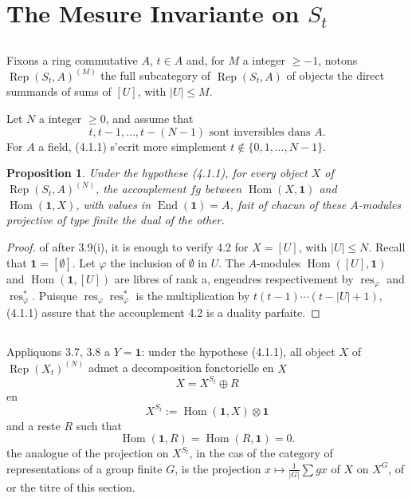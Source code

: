 \documentclass[11pt,a4paper]{article}
\theoremstyle{plain}
\newtheorem{proposition}[theorem]{Proposition}
\theoremstyle{definition}
\DeclareMathOperator{\Hom}{Hom}
\DeclareMathOperator{\End}{End}
\DeclareMathOperator{\Rep}{Rep}
\DeclareMathOperator{\res}{res}
\begin{document}
\section{The Mesure Invariante on $S_t$}

\subsection{}
Fixons a ring commutative $A$, $t \in A$ and, for $M$ a integer $\geq -1$, notons $\Rep(S_t, A)^{(M)}$ the full subcategory of $\Rep(S_t, A)$ of objects the direct summands of sums of $[U]$, with $|U| \leq M$.

Let $N$ a integer $\geq 0$, and assume that
\begin{equation}
t, t-1, \ldots, t-(N-1) \text{ sont inversibles dans } A. \tag{4.1.1}
\end{equation}
For $A$ a field, (4.1.1) s'ecrit more simplement $t \notin \{0, 1, \ldots, N-1\}$.

\begin{proposition}
Under the hypothese (4.1.1), for every object $X$ of $\Rep(S_t, A)^{(N)}$, the accouplement $fg$ between $\Hom(X, \mathbf{1})$ and $\Hom(\mathbf{1}, X)$, with values in $\End(\mathbf{1}) = A$, fait of chacun of these $A$-modules projective of type finite the dual of the other.
\end{proposition}

\begin{proof}
of after 3.9(i), it is enough to verify 4.2 for $X = [U]$, with $|U| \leq N$. Recall that $\mathbf{1} = [\emptyset]$. Let $\varphi$ the inclusion of $\emptyset$ in $U$. The $A$-modules $\Hom([U], \mathbf{1})$ and $\Hom(\mathbf{1}, [U])$ are libres of rank a, engendres respectivement by $\res_\varphi$ and $\res^*_\varphi$. Puisque $\res_\varphi \res^*_\varphi$ is the multiplication by $t(t-1)\cdots(t-|U|+1)$, (4.1.1) assure that the accouplement 4.2 is a duality parfaite.
\end{proof}

\subsection{}
Appliquons 3.7, 3.8 a $Y = \mathbf{1}$: under the hypothese (4.1.1), all object $X$ of $\Rep(X_t)^{(N)}$ admet a decomposition fonctorielle en $X$
\begin{equation}
X = X^{S_t} \oplus R \tag{4.3.1}
\end{equation}
en
\begin{equation}
X^{S_t} := \Hom(\mathbf{1}, X) \otimes \mathbf{1} \tag{4.3.2}
\end{equation}
and a reste $R$ such that
\begin{equation}
\Hom(\mathbf{1}, R) = \Hom(R, \mathbf{1}) = 0. \tag{4.3.3}
\end{equation}
the analogue of the projection on $X^{S_t}$, in the cas of the category of representations of a group finite $G$, is the projection $x \mapsto \frac{1}{|G|} \sum gx$ of $X$ on $X^G$, of or the titre of this section.
\end{document}
